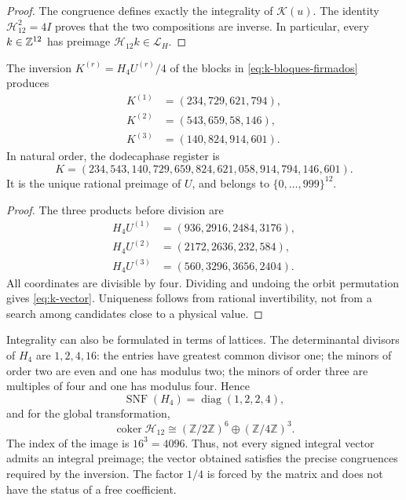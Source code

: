\begin{proof}
The congruence defines exactly the integrality of \(\mathscr K(u)\).
The identity \(\mathcal H_{12}^2=4I\) proves that the two compositions are
inverse. In particular, every \(k\in\mathbb Z^{12}\) has preimage
\(\mathcal H_{12}k\in\mathcal L_H\).
\end{proof}

\begin{proposition}
\label{prop:k-sello}
The inversion \(K^{(r)}=H_4U^{(r)}/4\) of the blocks in
\eqref{eq:k-bloques-firmados} produces
\begin{align*}
 K^{(1)}&=(234,729,621,794),\\
 K^{(2)}&=(543,659,58,146),\\
 K^{(3)}&=(140,824,914,601).
\end{align*}
In natural order, the dodecaphase register is
\begin{equation}
 K=(234,543,140,729,659,824,621,058,914,794,146,601).
 \label{eq:k-vector}
\end{equation}
It is the unique rational preimage of \(U\), and belongs to
\(\{0,\ldots,999\}^{12}\).
\end{proposition}

\begin{proof}
The three products before division are
\begin{align*}
 H_4U^{(1)}&=(936,2916,2484,3176),\\
 H_4U^{(2)}&=(2172,2636,232,584),\\
 H_4U^{(3)}&=(560,3296,3656,2404).
\end{align*}
All coordinates are divisible by four. Dividing and undoing the orbit
permutation gives \eqref{eq:k-vector}. Uniqueness follows from rational
invertibility, not from a search among candidates close to a physical value.
\end{proof}

Integrality can also be formulated in terms of lattices. The determinantal
divisors of \(H_4\) are \(1,2,4,16\): the entries have greatest common
divisor one; the minors of order two are even and one has modulus two; the
minors of order three are multiples of four and one has modulus four. Hence
\[
 \operatorname{SNF}(H_4)=\operatorname{diag}(1,2,2,4),
\]
and for the global transformation,
\[
 \operatorname{coker}\mathcal H_{12}
 \cong(\mathbb Z/2\mathbb Z)^6\oplus(\mathbb Z/4\mathbb Z)^3.
\]
The index of the image is \(16^3=4096\). Thus, not every signed integral
vector admits an integral preimage; the vector obtained satisfies the precise
congruences required by the inversion. The factor \(1/4\) is forced by the
matrix and does not have the status of a free coefficient.

